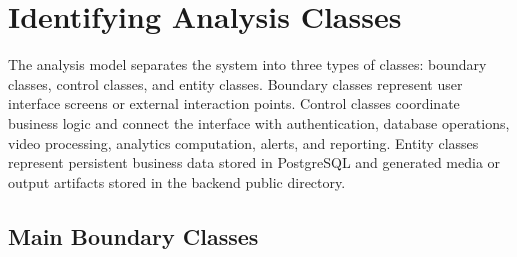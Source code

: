 \documentclass[12pt,a4paper]{report}
\begin{document}
\section{Identifying Analysis Classes}
\label{sec:identifying-analysis-classes}

The analysis model separates the system into three types of classes: boundary classes, control classes, and entity classes.
Boundary classes represent user interface screens or external interaction points.
Control classes coordinate business logic and connect the interface with authentication, database operations, video processing, analytics computation, alerts, and reporting.
Entity classes represent persistent business data stored in PostgreSQL and generated media or output artifacts stored in the backend public directory.

\subsection*{Main Boundary Classes}
\end{document}

